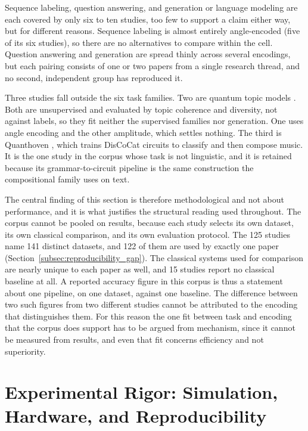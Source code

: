 \documentclass{ieeeaccess}
\begin{document}
Sequence labeling, question answering, and generation or language modeling are each covered by only six to ten studies, too few to support a claim either way, but for different reasons. Sequence labeling is almost entirely angle-encoded (five of its six studies), so there are no alternatives to compare within the cell. Question answering and generation are spread thinly across several encodings, but each pairing consists of one or two papers from a single research thread, and no second, independent group has reproduced it.

Three studies fall outside the six task families. Two are quantum topic models \cite{kabir_qtopic_2026,qiao_quantum_2024}. Both are unsupervised and evaluated by topic coherence and diversity, not against labels, so they fit neither the supervised families nor generation. One uses angle encoding and the other amplitude, which settles nothing. The third is Quanthoven \cite{miranda_quantum_2022}, which trains DisCoCat circuits to classify and then compose music. It is the one study in the corpus whose task is not linguistic, and it is retained because its grammar-to-circuit pipeline is the same construction the compositional family uses on text.

The central finding of this section is therefore methodological and not about performance, and it is what justifies the structural reading used throughout. The corpus cannot be pooled on results, because each study selects its own dataset, its own classical comparison, and its own evaluation protocol. The 125 studies name 141 distinct datasets, and 122 of them are used by exactly one paper (Section~\ref{subsec:reproducibility_gap}). The classical systems used for comparison are nearly unique to each paper as well, and 15 studies report no classical baseline at all. A reported accuracy figure in this corpus is thus a statement about one pipeline, on one dataset, against one baseline. The difference between two such figures from two different studies cannot be attributed to the encoding that distinguishes them. For this reason the one fit between task and encoding that the corpus does support has to be argued from mechanism, since it cannot be measured from results, and even that fit concerns efficiency and not superiority.

\section{Experimental Rigor: Simulation, Hardware, and Reproducibility}
\label{sec:experimental_rigor}
\end{document}
